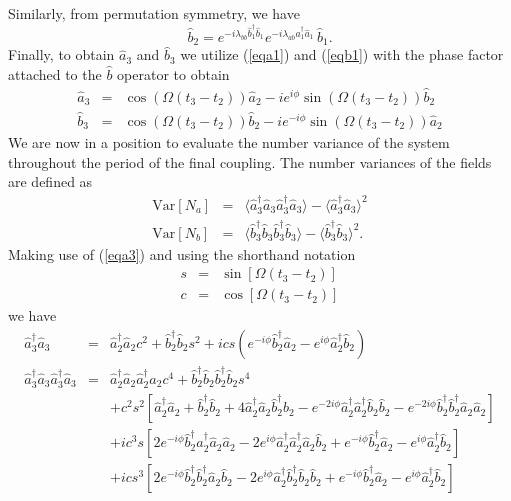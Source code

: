 \documentclass{iopart}
\begin{document}
Similarly, from permutation symmetry, we have
\begin{equation}
\hat{b}_2 = e^{-i \lambda_{bb} \hat{b}_1^{\dagger} \hat{b}_1} e^{-i \lambda_{ab} \hat{a}_1^{\dagger} \hat{a}_1} \, \hat{b}_1.     
\label{eqb2}
\end{equation}
Finally, to obtain $\hat{a}_3$ and $\hat{b}_3$ we utilize (\ref{eqa1}) and (\ref{eqb1}) with the phase factor attached to the $\hat{b}$ operator to obtain
\begin{eqnarray}
\hat{a}_3 &=& \cos (\Omega (t_3-t_2)) \hat{a}_2 -i e^{i\phi} \sin (\Omega (t_3-t_2)) \hat{b}_2 \label{eqa3} \\
\hat{b}_3 &=& \cos (\Omega (t_3-t_2)) \hat{b}_2 - i e^{-i\phi} \sin (\Omega (t_3-t_2)) \hat{a}_2 \label{eqb3}
\end{eqnarray} 
We are now in a position to evaluate the number variance of the system throughout the period of the final coupling. The number variances of the fields are defined as
\begin{eqnarray}
{\mathrm{Var}}[N_a] &=& \langle \hat{a}^{\dagger}_3 \hat{a}_3 \hat{a}^{\dagger}_3 \hat{a}_3 \rangle - \langle \hat{a}^{\dagger}_3 \hat{a}_3 \rangle ^2 \label{eqNavariance} \\
%
{\mathrm{Var}}[N_b] &=& \langle \hat{b}^{\dagger}_3 \hat{b}_3 \hat{b}^{\dagger}_3 \hat{b}_3 \rangle - \langle \hat{b}^{\dagger}_3 \hat{b}_3 \rangle ^2.
\label{eqNbvariance}
\end{eqnarray}
Making use of (\ref{eqa3}) and using the shorthand notation 
\begin{eqnarray}
s &=& \sin[\Omega (t_3 - t_2)] \\
c &=& \cos[\Omega (t_3 - t_2)]
\end{eqnarray}
we have
\begin{eqnarray}
\hat{a}^{\dagger}_3 \hat{a}_3 &=& \hat{a}^{\dagger}_2 \hat{a}_2 c^2 +  \hat{b}^{\dagger}_2 \hat{b}_2 s^2 + i c s (e^{-i \phi} \hat{b}^{\dagger}_2 \hat{a}_2 - e^{i \phi} \hat{a}^{\dagger}_2 \hat{b}_2) \\
%
%
\hat{a}^{\dagger}_3 \hat{a}_3 \hat{a}^{\dagger}_3 \hat{a}_3 &=& \hat{a}^{\dagger}_2 \hat{a}_2 \hat{a}^{\dagger}_2 \hat{a}_2 c^4 + \hat{b}^{\dagger}_2 \hat{b}_2 \hat{b}^{\dagger}_2 \hat{b}_2 s^4 \nonumber \\
%
&& + c^2 s^2 [ \hat{a}^{\dagger}_2 \hat{a}_2 + \hat{b}^{\dagger}_2 \hat{b}_2 + 4 \hat{a}^{\dagger}_2 \hat{a}_2 \hat{b}^{\dagger}_2 \hat{b}_2 -e^{-2 i \phi} \hat{a}^{\dagger}_2 \hat{a}^{\dagger}_2 \hat{b}_2 \hat{b}_2 -e^{-2 i \phi} \hat{b}^{\dagger}_2 \hat{b}^{\dagger}_2 \hat{a}_2 \hat{a}_2 ] \nonumber \\
%
&& + i c^3 s [2 e^{-i \phi} \hat{b}^{\dagger}_2 \hat{a}^{\dagger}_2 \hat{a}_2 \hat{a}_2 - 2 e^{i \phi} \hat{a}^{\dagger}_2 \hat{a}^{\dagger}_2 \hat{a}_2 \hat{b}_2 + e^{-i \phi} \hat{b}^{\dagger}_2 \hat{a}_2 - e^{i \phi} \hat{a}^{\dagger}_2 \hat{b}_2 ] \nonumber \\
%
&& + i c s^3 [2 e^{-i \phi} \hat{b}^{\dagger}_2 \hat{b}^{\dagger}_2 \hat{a}_2 \hat{b}_2 - 2 e^{i \phi} \hat{a}^{\dagger}_2 \hat{b}^{\dagger}_2 \hat{b}_2 \hat{b}_2 + e^{-i \phi} \hat{b}^{\dagger}_2 \hat{a}_2 - e^{i \phi} \hat{a}^{\dagger}_2 \hat{b}_2 ]
\end{eqnarray}
\end{document}
